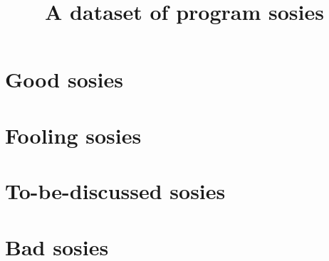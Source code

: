 \documentclass[table]{sig-alternate}
\title{A dataset of program sosies}
\author{}
\begin{document}
\maketitle

\section{Good sosies}





\section{Fooling sosies}
\label{sec:useless}

\section{To-be-discussed sosies}




\section{Bad sosies}


% 
% 
\end{document}
